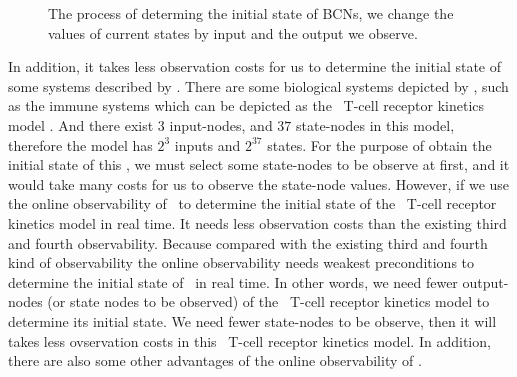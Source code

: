 \begin{figure}[thpb]
      \centering
      
      \caption{The process of determing the initial state of BCNs, we change the values of current states by input and the output we observe. }
      \label{fig:5}
   \end{figure}
In addition, it takes less observation costs for us to determine the initial state of some systems described by \BCNs. There are some biological systems depicted by \BCNs, such as the immune systems which can be depicted as the \BCN\ T-cell receptor kinetics model \cite{Klamt2006A}. And there exist $3$ input-nodes, and $37$ state-nodes in this model, therefore the model has $2^3$ inputs and $2^{37}$ states. For the purpose of obtain the initial state of this \BCN, we must select some state-nodes to be observe at first, and it would take many costs for us to observe the state-node values. However, if we use the online observability of \BCNs\ to determine the initial state of the \BCN\ T-cell receptor kinetics model in real time. It needs less observation costs than the existing third and fourth observability. Because compared with the existing third and fourth kind of observability the online observability needs weakest preconditions to determine the initial state of \BCNs\ in real time. In other words, we need fewer output-nodes (or state nodes to be observed) of the \BCN\ T-cell receptor kinetics model to determine its initial state. We need fewer state-nodes to be observe, then it will takes less ovservation costs in this \BCN\ T-cell receptor kinetics model. In addition, there are also some other advantages of the online observability of \BCNs.

